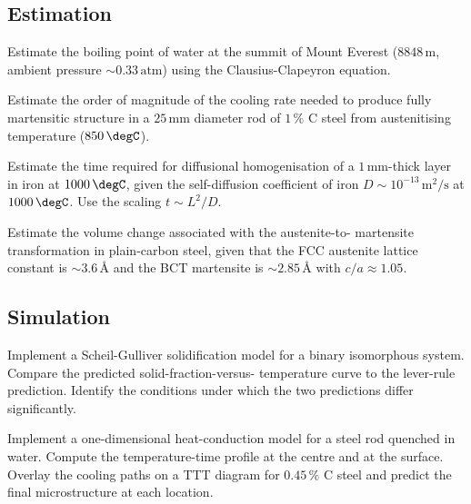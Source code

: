 \subsection*{Estimation}

\begin{exercise}
Estimate the boiling point of water at the summit of Mount Everest
($8848\,\text{m}$, ambient pressure $\sim 0.33\,\text{atm}$) using the
Clausius-Clapeyron equation.
\end{exercise}

\begin{exercise}
Estimate the order of magnitude of the cooling rate needed to produce
fully martensitic structure in a $25\,\text{mm}$ diameter rod of
$1\,\%$ C steel from austenitising temperature ($850\,\degC$).
\end{exercise}

\begin{exercise}
Estimate the time required for diffusional homogenisation of a $1\,
\si{\milli\meter}$-thick layer in iron at $1000\,\degC$, given the
self-diffusion coefficient of iron $D \sim 10^{-13}\,\text{m}^2/
\si{\second}$ at $1000\,\degC$. Use the scaling $t \sim L^2/D$.
\end{exercise}

\begin{exercise}
Estimate the volume change associated with the austenite-to-
martensite transformation in plain-carbon steel, given that the FCC
austenite lattice constant is $\sim 3.6\,\si{\angstrom}$ and the
BCT martensite is $\sim 2.85\,\si{\angstrom}$ with $c/a \approx 1.05$.
\end{exercise}

\subsection*{Simulation}

\begin{exercise}
Implement a Scheil-Gulliver solidification model for a binary
isomorphous system. Compare the predicted solid-fraction-versus-
temperature curve to the lever-rule prediction. Identify the
conditions under which the two predictions differ significantly.
\end{exercise}

\begin{exercise}
Implement a one-dimensional heat-conduction model for a steel rod
quenched in water. Compute the temperature-time profile at the
centre and at the surface. Overlay the cooling paths on a TTT
diagram for $0.45\,\%$ C steel and predict the final microstructure
at each location.
\end{exercise}

